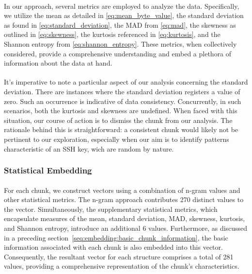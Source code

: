         \paragraph{}In our approach, several metrics are employed to analyze the data. Specifically, we utilize the mean as detailed in \ref{eq:mean_byte_value}, the standard deviation as found in \ref{eq:standard_deviation}, the MAD from \ref{eq:mad}, the skewness as outlined in \ref{eq:skewness}, the kurtosis referenced in \ref{eq:kurtosis}, and the Shannon entropy from \ref{eq:shannon_entropy}. These metrics, when collectively considered, provide a comprehensive understanding and embed a plethora of information about the data at hand.

        \paragraph{}It's imperative to note a particular aspect of our analysis concerning the standard deviation. There are instances where the standard deviation registers a value of zero. Such an occurrence is indicative of data consistency. Concurrently, in such scenarios, both the kurtosis and skewness are undefined. When faced with this situation, our course of action is to dismiss the \gls{chunk} from our analysis. The rationale behind this is straightforward: a consistent \gls{chunk} would likely not be pertinent to our exploration, especially when our aim is to identify patterns characteristic of an SSH key, wich are random by nature.
    \subsubsection{Statistical Embedding}

        \paragraph{}For each \gls{chunk}, we construct vectors using a combination of n-gram values and other statistical metrics. The n-gram approach contributes 270 distinct values to the vector. Simultaneously, the supplementary statistical metrics, which encapsulate measures of the mean, standard deviation, MAD, skewness, kurtosis, and Shannon entropy, introduce an additional 6 values. Furthermore, as discussed in a preceding section~\ref{seq:embedding:basic_chunk_information}, the basic information associated with each chunk is also embedded into this vector. Consequently, the resultant vector for each structure comprises a total of 281 values, providing a comprehensive representation of the chunk's characteristics.
    
